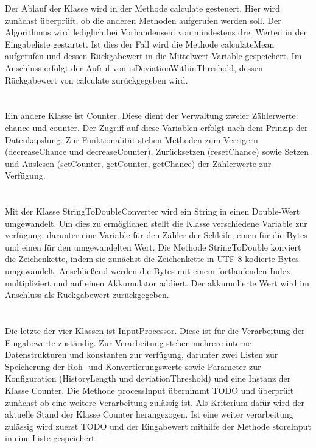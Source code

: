 \documentclass{article}
\begin{document}
    Der Ablauf der Klasse wird in der Methode calculate gesteuert. Hier wird zunächst überprüft, ob die anderen Methoden aufgerufen werden soll.
    Der Algorithmus wird lediglich bei Vorhandensein von mindestens drei Werten in der Eingabeliste gestartet.
    Ist dies der Fall wird die Methode calculateMean aufgerufen und dessen Rückgabewert in die Mittelwert-Variable gespeichert.
    Im Anschluss erfolgt der Aufruf von isDeviationWithinThreshold, dessen Rückgabewert von calculate zurückgegeben wird.\\
    \\
    \\
    Ein andere Klasse ist Counter.
    Diese dient der Verwaltung zweier Zählerwerte: chance und counter.
    Der Zugriff auf diese Variablen erfolgt nach dem Prinzip der Datenkapslung.
    Zur Funktionalität stehen Methoden zum Verrigern (decreaseChance und decreaseCounter), Zurücksetzen (resetChance) sowie Setzen und Auslesen (setCounter, getCounter, getChance) der Zählerwerte zur Verfügung.\\
    \\
    \\
    Mit der Klasse StringToDoubleConverter wird ein String in einen Double-Wert umgewandelt.
    Um dies zu ermöglichen stellt die Klasse verschiedene Variable zur verfügung, darunter eine Variable für den Zähler der Schleife, einen für die Bytes und einen für den umgewandelten Wert.
    Die Methode StringToDouble konviert die Zeichenkette, indem sie zunächst die Zeichenkette in UTF-8 kodierte Bytes umgewandelt.
    Anschließend werden die Bytes mit einem fortlaufenden Index multipliziert und auf einen Akkumulator addiert.
    Der akkumulierte Wert wird im Anschluss als Rückgabewert zurückgegeben.\\
    \\
    \\
    Die letzte der vier Klassen ist InputProcessor.
    Diese ist für die Verarbeitung der Eingabewerte zuständig.
    Zur Verarbeitung stehen mehrere interne Datenstrukturen und konstanten zur verfügung, darunter zwei Listen zur Speicherung der Roh- und Konvertierungswerte sowie Parameter zur Konfiguration (HistoryLength und deviationThreshold) und eine Instanz der Klasse Counter.
    Die Methode processInput übernimmt TODO und überprüft zunächst ob eine weitere Verarbeitung zulässig ist. 
    Als Kriterium dafür wird der aktuelle Stand der Klasse Counter herangezogen.
    Ist eine weiter verarbeitung zulässig wird zuerst TODO und der Eingabewert mithilfe der Methode storeInput in eine Liste gespeichert.
\end{document}
